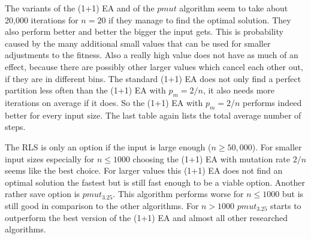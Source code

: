 

The variants of the (1+1) EA and of the $pmut$ algorithm seem to take about 20,000 iterations for $n=20$ if they manage to find the optimal solution.
They also perform better and better the bigger the input gets.
This is probability caused by the many additional small values that can be used for smaller adjustments to the fitness.
Also a really high value does not have as much of an effect, because there are possibly other larger values which cancel each other out, if they are in different bins.
The standard (1+1) EA does not only find a perfect partition less often than the (1+1) EA with $p_m=2/n$, it also needs more iterations on average if it does.
So the (1+1) EA with $p_m=2/n$ performs indeed better for every input size.
The last table again lists the total average number of steps.


The RLS is only an option if the input is large enough ($n \ge 50,000$). For smaller input sizes especially for $n \le 1000$ choosing the (1+1) EA with mutation rate $2/n$ seems like the best choice. For larger values this (1+1) EA does not find an optimal solution the fastest but is still fast enough to be a viable option. Another rather save option is $pmut_{3.25}$. This algorithm performs worse for $n \le 1000$ but is still good in comparison to the other algorithms. For $n > 1000$ $pmut_{3.25}$ starts to outperform the best version of the (1+1) EA and almost all other researched algorithms.
